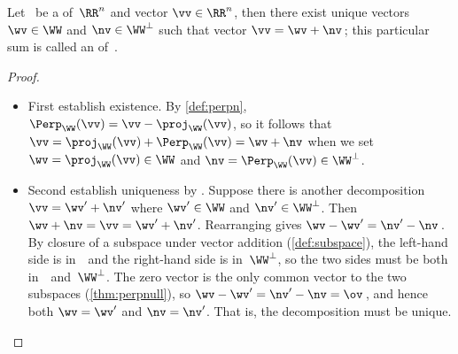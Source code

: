 \begin{reduce}
\begin{theorem} \label{thm:odt}
Let \WW\ be a  of~\(\RR^n\) and vector \(\vv\in\RR^n\), then there exist unique vectors \(\wv\in\WW\) and \(\nv\in\WW^\perp\) such that vector \(\vv=\wv+\nv\)\,; this particular sum is called an  of~\vv.
\end{theorem}

\begin{proof} 
\begin{itemize}
\item First establish existence.  
By \autoref{def:perpn}, \(\Perp_\WW(\vv)=\vv-\proj_\WW(\vv)\), so it follows that \(\vv=\proj_\WW(\vv)+\Perp_\WW(\vv)=\wv+\nv\) when we set \(\wv=\proj_\WW(\vv)\in\WW\) and \(\nv=\Perp_\WW(\vv)\in\WW^\perp\).

\item Second establish uniqueness by .
Suppose there is another decomposition \(\vv=\wv'+\nv'\) where \(\wv'\in\WW\) and \(\nv'\in\WW^\perp\).
Then \(\wv+\nv=\vv=\wv'+\nv'\).
Rearranging gives \(\wv-\wv'=\nv'-\nv\)\,.
By closure of a subspace under vector addition (\autoref{def:subspace}), the left-hand side is in~\WW\ and the right-hand side is in~\(\WW^\perp\), so the two sides must be both in~\WW\ and~\(\WW^\perp\).
The zero vector is the only common vector to the two subspaces (\autoref{thm:perpnull}), so \(\wv-\wv'=\nv'-\nv=\ov\)\,, and hence both \(\wv=\wv'\) and \(\nv=\nv'\).
That is, the decomposition must be unique.
\end{itemize}
\end{proof}


\end{reduce}
\newcommand{\projxv}[9]{\begin{tikzpicture}
  \begin{axis}[footnotesize
  ,axis equal ,axis x line=none , axis y line=none
  ,samples=2 ]
  \addplot[black,mark=*]coordinates {(0,0)};
  \addplot[red,quiver={u=#1,v=#2},-stealth]coordinates {(0,0)};
  \node[right] at (axis cs:#1,#2) {$\vec #9$};
  \addplot[blue,quiver={u=#3,v=#4},-stealth]coordinates {(0,0)};
  \node[right] at (axis cs:#3,#4) {$\vec #8$};
  \ifnum#7>0
  \addplot[black] coordinates {(#5/2,#6/2)} node {proj};
  \addplot[brown,thick,quiver={u=#5,v=#6},-stealth]coordinates {(0,0)};
  \addplot[black] coordinates {(#1/2+#5/2,#2/2+#6/2)} node {perp};
  \addplot[brown,thick,quiver={u=#1-#5,v=#2-#6},-stealth]coordinates {(#5,#6)};
  \fi
  \end{axis}
\end{tikzpicture}}
